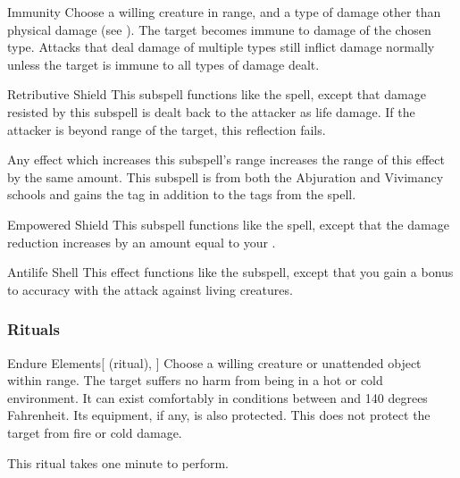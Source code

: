 \begin{ability}[\nth{3}]{Immunity}
Choose a willing creature in \rngclose range, and a type of damage other than physical damage (see ).
The target becomes immune to damage of the chosen type.
Attacks that deal damage of multiple types still inflict damage normally unless the target is immune to all types of damage dealt.
\end{ability}
\vspace{0.25em}



\begin{ability}[\nth{3}]{Retributive Shield}
This subspell functions like the  spell, except that damage resisted by this subspell is dealt back to the attacker as life damage.
If the attacker is beyond \rngclose range of the target, this reflection fails.

Any effect which increases this subspell's range increases the range of this effect by the same amount.
This subspell is from both the Abjuration and Vivimancy schools and gains the  tag in addition to the tags from the  spell.
\end{ability}
\vspace{0.25em}



\begin{ability}[\nth{4}]{Empowered Shield}
This subspell functions like the  spell, except that the damage reduction increases by an amount equal to your .
\end{ability}
\vspace{0.25em}



\begin{ability}[\nth{5}]{Antilife Shell}
This effect functions like the  subspell, except that you gain a  bonus to accuracy with the attack against living creatures.
\end{ability}
\vspace{0.25em}



\subsubsection{Rituals}


\begin{ability}[\nth{1}]{Endure Elements}[ (ritual), ]
Choose a willing creature or unattended object within \rngclose range.
The target suffers no harm from being in a hot or cold environment.
It can exist comfortably in conditions between  and 140 degrees Fahrenheit.
Its equipment, if any, is also protected.
This does not protect the target from fire or cold damage.

This ritual takes one minute to perform.
\end{ability}
\vspace{0.25em}



